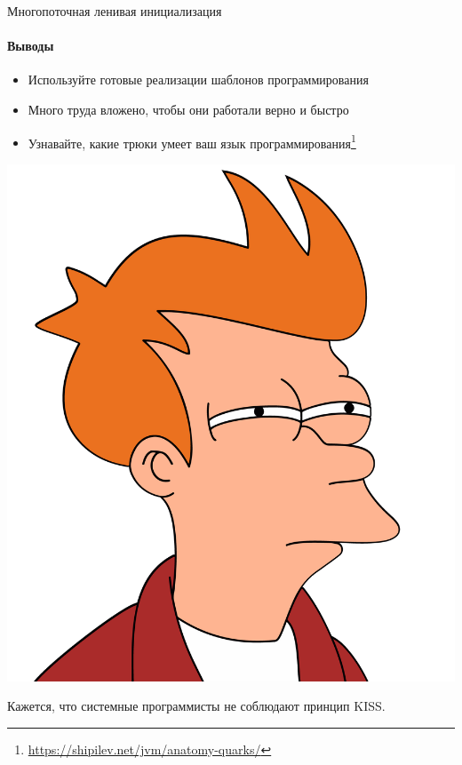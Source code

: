 % 
% 


\begin{frame}[t,fragile]{Многопоточная ленивая инициализация}
\framesubtitle{Выводы}

\begin{itemize}
    \item Используйте готовые реализации шаблонов программирования
    
    \pause
    \item Много труда вложено, чтобы они работали верно и быстро

    \pause
    \item Узнавайте, какие трюки умеет ваш язык программирования\footnote<3->{\tiny\url{https://shipilev.net/jvm/anatomy-quarks/}}

\end{itemize}

\pause

\includegraphics[width=.3\textwidth]{production/suspicious-fry.png}

\pause
Кажется, что системные программисты не соблюдают принцип KISS.

\end{frame}

% 
% 
% 
% 
% 
% 
% 
% 
% 
% 
% 
% 
% 
% 
%

